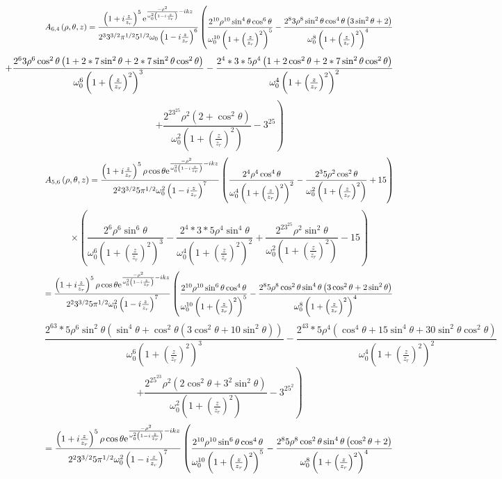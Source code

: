 \documentclass[11pt]{amsart}
\makeatletter
\newcommand{\e}{{\rm e}}				%
\newcommand{\msp}[1]{\mspace{#1mu}}		%
\newcommand{\0}{\varnothing}		%
\newcommand{\1}{!}
\newcommand{\2}{@}
\newcommand{\3}{\#}
\newcommand{\4}{\$}
\newcommand{\5}{\%}
\newcommand{\6}{$^\wedge$}
\newcommand{\7}{\&}
\newcommand{\8}{*}
\newcommand{\9}{(}
\makeatother
\begin{document}
\[
A_{6,4}\left(\rho,\theta,z\right) = \frac{\left(1+i\frac{z}{z_r}\right)^5\e^{\frac{-\rho^2}{\omega_0^2\left(1-i\frac{z}{z_r}\right)}-ikz}}{2^33^{3/2}\pi^{1/2}5^{1/2}\omega_0\left(1-i\frac{z}{z_r}\right)^6}\left(\frac{2^{10}\rho^{10}\sin^4\theta\cos^6\theta}{\omega_0^{10}\left(1+\left(\frac{z}{z_r}\right)^2\right)^5}-\frac{2^83\rho^8\sin^2\theta\cos^4\theta\left(3\sin^2\theta+2\right)}{\omega_0^8\left(1+\left(\frac{z}{z_r}\right)^2\right)^4}\right.
\]
\[
\msp{-80}\left.+\frac{2^63\rho^6\cos^2\theta\left(1+2*7\sin^2\theta+2*7\sin^2\theta\cos^2\theta\right)}{\omega_0^6\left(1+\left(\frac{z}{z_r}\right)^2\right)^3}-\frac{2^4*3*5\rho^4\left(1+2\cos^2\theta +2*7\sin^2\theta\cos^2\theta\right)}{\omega_0^4\left(1+\left(\frac{z}{z_r}\right)^2\right)^2}\right.
\]
\[
\left.+\frac{2^23^25\rho^2\left(2+\cos^2\theta\right)}{\omega_0^2\left(1+\left(\frac{z}{z_r}\right)^2\right)}-3^25\right)
\]
\[
A_{5,6}\left(\rho,\theta,z\right) = \frac{\left(1+i\frac{z}{z_r}\right)^5\rho \cos\theta \e^{\frac{-\rho^2}{\omega_0^2\left(1-i\frac{z}{z_r}\right)}-ikz}}{2^23^{3/2}5\pi^{1/2}\omega_0^2\left(1-i\frac{z}{z_r}\right)^7}\left(\frac{2^4\rho^4\cos^4\theta}{\omega_0^4\left(1+\left(\frac{z}{z_r}\right)^2\right)^2}-\frac{2^35\rho^2\cos^2\theta}{\omega_0^2\left(1+\left(\frac{z}{z_r}\right)^2\right)}+15\right)
\]
\[
\times\left(\frac{2^6\rho^6\sin^6\theta}{\omega_0^6\left(1+\left(\frac{z}{z_r}\right)^2\right)^3}-\frac{2^4*3*5\rho^4 \sin^4\theta}{\omega_0^4\left(1+\left(\frac{z}{z_r}\right)^2\right)^2}+\frac{2^23^25\rho^2\sin^2\theta}{\omega_0^2\left(1+\left(\frac{z}{z_r}\right)^2\right)}-15\right)
\]
\[
= \frac{\left(1+i\frac{z}{z_r}\right)^5\rho \cos\theta \e^{\frac{-\rho^2}{\omega_0^2\left(1-i\frac{z}{z_r}\right)}-ikz}}{2^23^{3/2}5\pi^{1/2}\omega_0^2\left(1-i\frac{z}{z_r}\right)^7}\left(\frac{2^{10}\rho^{10}\sin^6\theta\cos^4\theta}{\omega_0^{10}\left(1+\left(\frac{z}{z_r}\right)^2\right)^5}-\frac{2^85\rho^8\cos^2\theta\sin^4\theta\left(3\cos^2\theta+2\sin^2\theta\right)}{\omega_0^8\left(1+\left(\frac{z}{z_r}\right)^2\right)^4}\right.
\]
\[
\left. \frac{2^63*5\rho^6\sin^2\theta\left(\sin^4\theta+\cos^2\theta\left(3\cos^2\theta +10\sin^2\theta\right)\right)}{\omega_0^6\left(1+\left(\frac{z}{z_r}\right)^2\right)^3}-\frac{2^43*5\rho^4\left(\cos^4\theta +15\sin^4\theta+30\sin^2\theta\cos^2\theta\right)}{\omega_0^4\left(1+\left(\frac{z}{z_r}\right)^2\right)^2}\right.
\]
\[
\left.+\frac{2^25^23\rho^2\left(2\cos^2\theta+3^2\sin^2\theta\right)}{\omega_0^2\left(1+\left(\frac{z}{z_r}\right)^2\right)}-3^25^2\right)
\]
\[
= \frac{\left(1+i\frac{z}{z_r}\right)^5\rho \cos\theta \e^{\frac{-\rho^2}{\omega_0^2\left(1-i\frac{z}{z_r}\right)}-ikz}}{2^23^{3/2}5\pi^{1/2}\omega_0^2\left(1-i\frac{z}{z_r}\right)^7}\left(\frac{2^{10}\rho^{10}\sin^6\theta\cos^4\theta}{\omega_0^{10}\left(1+\left(\frac{z}{z_r}\right)^2\right)^5}-\frac{2^85\rho^8\cos^2\theta\sin^4\theta\left(\cos^2\theta+2\right)}{\omega_0^8\left(1+\left(\frac{z}{z_r}\right)^2\right)^4}\right.
\]
\end{document}
